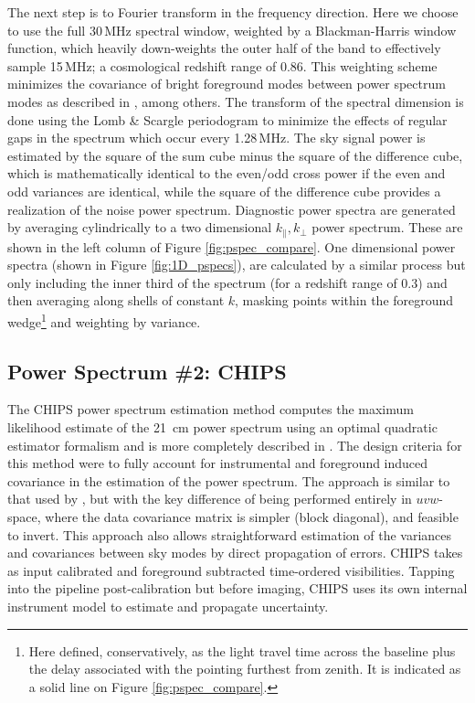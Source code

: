 \documentclass[twolcolumn]{emulateapj}
\def\chipscite{\cite{2016arXiv160102073T}}
\begin{document}
The next step is to Fourier transform in the frequency direction. Here we choose to use the full 30\,MHz spectral window, weighted by a Blackman-Harris window function, which heavily down-weights the outer half of the band to effectively sample 15\,MHz; a cosmological redshift range of 0.86. This weighting scheme minimizes the covariance of bright foreground modes between power spectrum modes as described in \cite{Thyagarajan:2013p10039,Parsons:2012p8896,Vedantham:2012p9026}, among others.  The transform of the spectral dimension is done using the Lomb \& Scargle periodogram to minimize the effects of regular gaps in the spectrum which occur every 1.28\,MHz.    The sky signal power is  estimated by the square of the sum cube minus the square of the difference cube, which  is mathematically identical to the even/odd cross power if the even and odd variances are identical, while the square of the difference cube provides a realization of the noise power spectrum. Diagnostic power spectra are generated by averaging cylindrically to a two dimensional $k_{\|},k_{\bot}$ power spectrum.  These are shown in the left column of Figure \ref{fig:pspec_compare}.  One dimensional power spectra (shown in Figure \ref{fig:1D_pspecs}), are calculated by a similar process but only including the inner third of the spectrum (for a redshift range of 0.3) and then averaging along shells of constant $k$, masking points within the foreground wedge\footnote{Here defined, conservatively, as the light travel time across the baseline plus the delay associated with the pointing furthest from zenith. It is indicated as a solid line on Figure \ref{fig:pspec_compare}.} and weighting by variance.






\subsection{Power Spectrum \#2: CHIPS}
\label{sec:CHIPS}
The CHIPS power spectrum estimation method computes the maximum likelihood estimate of the 21~cm power spectrum using an optimal quadratic estimator formalism and is more completely described in \chipscite{}.  The design criteria for this method were to fully account for instrumental and foreground induced covariance in the estimation of the power spectrum.  The approach is similar to that used by \cite{Liu:2011p8763}, but with the key difference of being performed entirely in $uvw$-space, where the data covariance matrix is simpler (block diagonal), and feasible to invert. This approach also allows straightforward estimation of the variances and covariances between sky modes by direct propagation of errors. CHIPS takes as input calibrated and foreground subtracted time-ordered visibilities. Tapping into the pipeline post-calibration but before imaging, CHIPS uses its own internal instrument model to estimate and propagate uncertainty.	
\end{document}
